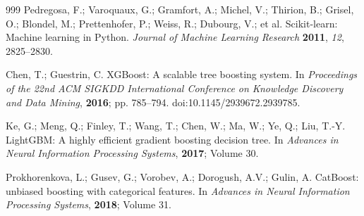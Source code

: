 \documentclass[journal,article,submit,moreauthors]{Definitions/mdpi}
\begin{document}
\begin{thebibliography}{999}
Pedregosa, F.; Varoquaux, G.; Gramfort, A.; Michel, V.; Thirion, B.; Grisel, O.; Blondel, M.;
Prettenhofer, P.; Weiss, R.; Dubourg, V.; et al. Scikit-learn: Machine learning in Python.
\textit{Journal of Machine Learning Research} \textbf{2011}, \textit{12}, 2825--2830.

Chen, T.; Guestrin, C. XGBoost: A scalable tree boosting system. In \textit{Proceedings of
the 22nd ACM SIGKDD International Conference on Knowledge Discovery and Data Mining},
\textbf{2016}; pp. 785--794. doi:10.1145/2939672.2939785.

Ke, G.; Meng, Q.; Finley, T.; Wang, T.; Chen, W.; Ma, W.; Ye, Q.; Liu, T.-Y. LightGBM: A
highly efficient gradient boosting decision tree. In \textit{Advances in Neural Information
Processing Systems}, \textbf{2017}; Volume 30.

Prokhorenkova, L.; Gusev, G.; Vorobev, A.; Dorogush, A.V.; Gulin, A. CatBoost: unbiased
boosting with categorical features. In \textit{Advances in Neural Information Processing
Systems}, \textbf{2018}; Volume 31.

\end{thebibliography}
\end{document}
